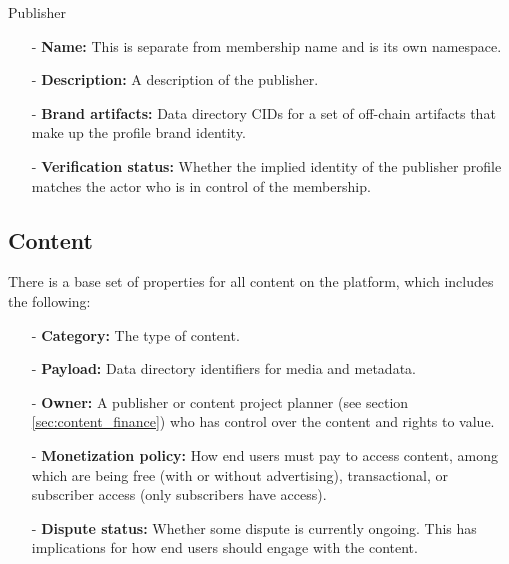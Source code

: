 \documentclass{article}
\newenvironment{concept_box}[1]
    {
    \begin{tcolorbox}
    {\large \textbf{#1} }
    }
    {
    \end{tcolorbox}
    }
\begin{document}
\begin{concept_box}{Publisher}
    \begin{itemize}

        \item[-] \textbf{Name:} This is separate from membership name and is its own namespace.

        \item[-] \textbf{Description:} A description of the publisher.

        \item[-] \textbf{Brand artifacts:} Data directory CIDs for a set of off-chain artifacts that make up the profile brand identity.

        \item[-] \textbf{Verification status:} Whether the implied identity of the publisher profile matches the actor who is in control of the membership.

    \end{itemize}
\end{concept_box}

\subsection{Content}

There is a base set of properties for all content on the platform, which includes the following:

\begin{itemize}

    \item[-] \textbf{Category:} The type of content.

    \item[-] \textbf{Payload:} Data directory identifiers for media and metadata.

    \item[-] \textbf{Owner:} A publisher or content project planner (see section \ref{sec:content_finance}) who has control over the content and rights to value.

    \item[-] \textbf{Monetization policy:} How end users must pay to access content, among which are being free (with or without advertising), transactional, or subscriber access (only subscribers have access).

    \item[-] \textbf{Dispute status:} Whether some dispute is currently ongoing. This has implications for how end users should engage with the content.

\end{itemize}
\end{document}
